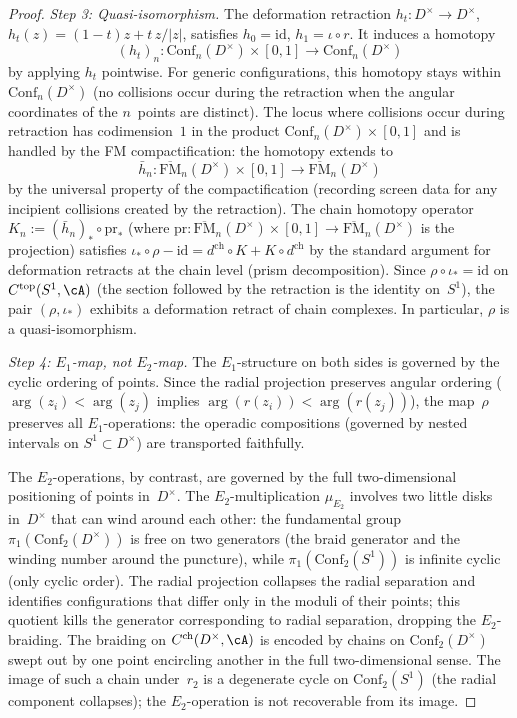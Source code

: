 \begin{proof}
\medskip
\noindent\textit{Step 3: Quasi-isomorphism.}
The deformation retraction
$h_t\colon D^\times\to D^\times$,
$h_t(z)=(1-t)z+t\,z/|z|$, satisfies $h_0=\mathrm{id}$,
$h_1=\iota\circ r$. It induces a homotopy
\[
 (h_t)_n\colon
 \mathrm{Conf}_n(D^\times)\times[0,1]
 \longrightarrow\mathrm{Conf}_n(D^\times)
\]
by applying $h_t$ pointwise. For generic configurations,
this homotopy stays within
$\mathrm{Conf}_n(D^\times)$ (no collisions occur
during the retraction when the angular coordinates of
the $n$~points are distinct).
The locus where collisions occur during retraction has
codimension~$1$ in the product
$\mathrm{Conf}_n(D^\times)\times[0,1]$
and is handled by the FM compactification: the homotopy
extends to
\[
 \bar h_n\colon
 \overline{\mathrm{FM}}_n(D^\times)\times[0,1]
 \longrightarrow
 \overline{\mathrm{FM}}_n(D^\times)
\]
by the universal property of the compactification
(recording screen data for any incipient collisions
created by the retraction).
The chain homotopy operator
$K_n:=(\bar h_n)_\ast\circ\mathrm{pr}_\ast$
(where $\mathrm{pr}\colon
\overline{\mathrm{FM}}_n(D^\times)\times[0,1]
\to\overline{\mathrm{FM}}_n(D^\times)$ is the
projection) satisfies
$\iota_\ast\circ\rho - \mathrm{id}
= d^{\mathrm{ch}}\circ K + K\circ d^{\mathrm{ch}}$
by the standard argument for deformation retracts at
the chain level (prism decomposition). Since
$\rho\circ\iota_\ast=\mathrm{id}$ on
$C^{\mathrm{top}}(S^1,\cA)$
(the section followed by the retraction is the identity
on~$S^1$), the pair $(\rho,\iota_\ast)$ exhibits a
deformation retract of chain complexes.
In particular, $\rho$ is a quasi-isomorphism.

\medskip
\noindent\textit{Step 4: $E_1$-map, not $E_2$-map.}
The $E_1$-structure on both sides is governed by the
cyclic ordering of points.
Since the radial projection preserves angular ordering
($\arg(z_i)<\arg(z_j)$ implies
$\arg(r(z_i))<\arg(r(z_j))$), the map~$\rho$ preserves
all $E_1$-operations: the operadic compositions
(governed by nested intervals on $S^1\subset D^\times$)
are transported faithfully.

The $E_2$-operations, by contrast, are governed by the
full two-dimensional positioning of points in~$D^\times$.
The $E_2$-multiplication $\mu_{E_2}$ involves two
little disks in~$D^\times$ that can wind around each
other: the fundamental group
$\pi_1(\mathrm{Conf}_2(D^\times))$ is free on two
generators (the braid generator and the winding number
around the puncture), while
$\pi_1(\mathrm{Conf}_2(S^1))$ is infinite cyclic
(only cyclic order).
The radial projection collapses the radial separation
and identifies configurations that differ only in the
moduli of their points; this quotient kills the
generator corresponding to radial separation, dropping the $E_2$-braiding.
The braiding on
$C^{\mathrm{ch}}(D^\times,\cA)$ is encoded by chains
on $\mathrm{Conf}_2(D^\times)$ swept out by one point
encircling another in the full two-dimensional sense.
The image of such a chain under~$r_2$ is a
degenerate cycle on $\mathrm{Conf}_2(S^1)$ (the
radial component collapses); the $E_2$-operation
is not recoverable from its image.
\end{proof}

